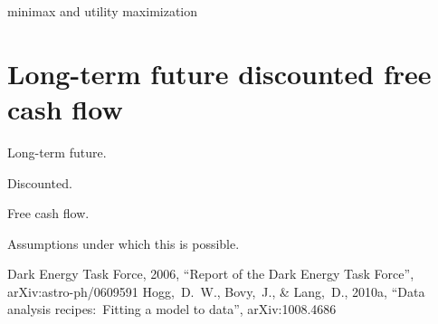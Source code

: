 \documentclass[12pt,twoside,pdftex]{article}
\begin{document}
minimax and utility maximization

\section{Long-term future discounted free cash flow}

Long-term future.

Discounted.

Free cash flow.

Assumptions under which this is possible.

\clearpage
{}\theendnotes

\clearpage
\begin{thebibliography}{}\raggedright
{}
  Dark Energy Task Force, 2006,
  ``Report of the Dark Energy Task Force'', arXiv:astro-ph/0609591
  Hogg,~D.~W., Bovy,~J., \& Lang,~D., 2010a,
  ``Data analysis recipes:\ Fitting a model to data'', arXiv:1008.4686
\end{thebibliography}
\end{document}
